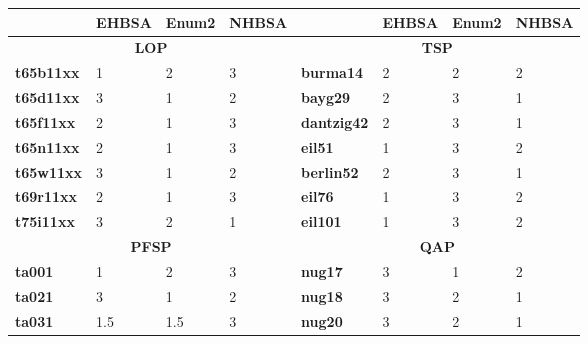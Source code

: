 \begin{table}[t]
    \centering
    \begin{tabular}{|l|l|l|l|l|l|l|l|}
    \hline
    \textbf{}         & \textbf{EHBSA}    & \textbf{Enum2} & \textbf{NHBSA} & \textbf{}         & \textbf{EHBSA}    & \textbf{Enum2} & \textbf{NHBSA} \\ \hline
    \multicolumn{4}{|c|}{\textbf{LOP}}                              & \multicolumn{4}{c|}{\textbf{TSP}}                                \\ \hline
    \textbf{t65b11xx} & 1              & 2              & 3         & \textbf{burma14}   & 2              & 2              & 2         \\ \hline
    \textbf{t65d11xx} & 3              & 1              & 2         & \textbf{bayg29}    & 2              & 3              & 1         \\ \hline
    \textbf{t65f11xx} & 2              & 1              & 3         & \textbf{dantzig42} & 2              & 3              & 1         \\ \hline
    \textbf{t65n11xx} & 2              & 1              & 3         & \textbf{eil51}     & 1              & 3              & 2         \\ \hline
    \textbf{t65w11xx} & 3              & 1              & 2         & \textbf{berlin52}  & 2              & 3              & 1         \\ \hline
    \textbf{t69r11xx} & 2              & 1              & 3         & \textbf{eil76}     & 1              & 3              & 2         \\ \hline
    \textbf{t75i11xx} & 3              & 2              & 1         & \textbf{eil101}    & 1              & 3              & 2         \\ \hline
    \multicolumn{4}{|c|}{\textbf{PFSP}}                                      & \multicolumn{4}{c|}{\textbf{QAP}}                                         \\ \hline
    \textbf{ta001}    & 1              & 2              & 3         & \textbf{nug17}     & 3              & 1              & 2         \\ \hline
    \textbf{ta021}    & 3              & 1              & 2         & \textbf{nug18}     & 3              & 2              & 1         \\ \hline
    \textbf{ta031}    & 1.5            & 1.5            & 3         & \textbf{nug20}     & 3              & 2              & 1         \\ \hline

\end{tabular}
\end{table}

